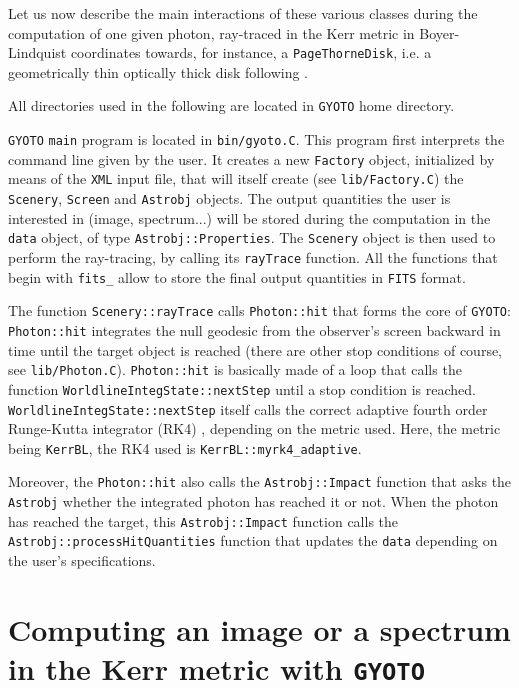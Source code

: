 \documentclass[a4paper,12pt]{article}
\begin{document}
\begin{sloppypar} %
Let us now describe the main interactions of these various classes during the computation of one given photon, ray-traced in the Kerr metric in Boyer-Lindquist coordinates towards, for instance, a \texttt{PageThorneDisk}, i.e. a geometrically thin optically thick disk following \citet{page74}.

All directories used in the following are located in \texttt{GYOTO} home directory.

\texttt{GYOTO} \texttt{main} program is located in \texttt{bin/gyoto.C}. This program first interprets the command line given by the user. It creates a new \texttt{Factory} object, initialized by means of the \texttt{XML} input file, that will itself create (see \texttt{lib/Factory.C}) the \texttt{Scenery}, \texttt{Screen} and \texttt{Astrobj} objects. The output quantities the user is interested in (image, spectrum...) will be stored during the computation in the \texttt{data} object, of type \texttt{Astrobj::Properties}. The \texttt{Scenery} object is then used to perform the ray-tracing, by calling its \texttt{rayTrace} function. All the functions that begin with \texttt{fits\_} allow to store the final output quantities in \texttt{FITS} format.

The function \texttt{Scenery::rayTrace} calls \texttt{Photon::hit} that forms the core of \texttt{GYOTO}: \texttt{Photon::hit} integrates the null geodesic from the observer's screen backward in time until the target object is reached (there are other stop conditions of course, see \texttt{lib/Photon.C}). \texttt{Photon::hit} is basically made of a loop that calls the function \texttt{WorldlineIntegState::nextStep} until a stop condition is reached.  \texttt{WorldlineIntegState::nextStep} itself calls the correct adaptive fourth order Runge-Kutta integrator (RK4) , depending on the metric used. Here, the metric being \texttt{KerrBL}, the RK4 used is \texttt{KerrBL::myrk4\_adaptive}. 

Moreover, the \texttt{Photon::hit} also calls the \texttt{Astrobj::Impact} function that asks the \texttt{Astrobj} whether the integrated photon has reached it or not. When the photon has reached the target, this \texttt{Astrobj::Impact} function calls the \texttt{Astrobj::processHitQuantities} function that updates the \texttt{data} depending on the user's specifications. 
\end{sloppypar}

\section{Computing an image or a spectrum in the Kerr metric with \texttt{GYOTO}}
\label{kerr}
\end{document}
